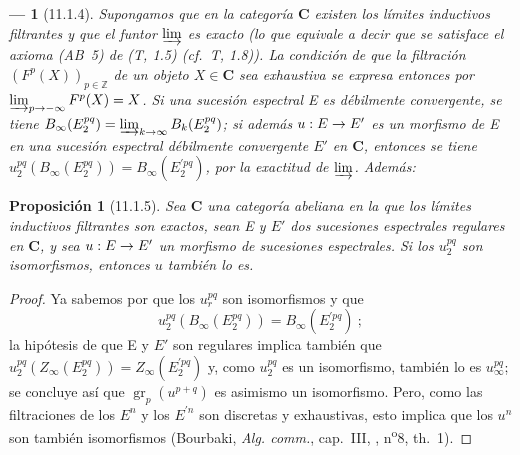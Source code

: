 \documentclass[10pt,oneside,openany]{book}
\theoremstyle{egaenv}\newtheorem*{env}{---}
\theoremstyle{egastatement}
\newtheorem*{proposition}{Proposición}
\theoremstyle{egadescription}
\newcommand{\oldpage}[2][]{\marginnote{\normalfont\scriptsize\textbf{#1}\,|\,#2}\ignorespaces}
\renewcommand{\to}{\mathchoice{\longrightarrow}{\rightarrow}{\rightarrow}{\rightarrow}}
\begin{document}
\begin{env}[11.1.4]
\label{0.11.1.4}
\label{0.11.1.4-fr}
Supongamos que en la categoría $\boldsymbol{C}$ existen los límites inductivos filtrantes y que el funtor $\varinjlim$ es \emph{exacto} (lo que equivale a decir que se satisface el axioma (AB~5) de (T, 1.5) (cf.~T, 1.8)).
La condición de que la filtración $(F^p(X))_{p\in\mathbb Z}$ de un objeto $X\in\boldsymbol{C}$ sea exhaustiva se expresa entonces por $\varinjlim_{p\to-\infty}F^p(X)=X$. Si una sucesión espectral E es débilmente convergente, se tiene
$B_\infty(E_2^{pq})=\varinjlim_{k\to\infty}B_k(E_2^{pq})$; si además $u:E\to E'$ es un morfismo de E en una sucesión espectral débilmente convergente $E'$ en $\boldsymbol{C}$, entonces se tiene $u_2^{pq}(B_\infty(E_2^{pq}))=B_\infty(E_2^{\prime pq})$, por la exactitud de $\varinjlim$.
Además:
\end{env}

\begin{proposition}[11.1.5]
\label{0.11.1.5}
\label{0.11.1.5-fr}
Sea $\mathbf{C}$ una categoría abeliana en la que los límites inductivos filtrantes son exactos, sean \textup{E} y $E'$ dos sucesiones espectrales regulares en $\mathbf{C}$, y sea $u:E\to E'$ un morfismo de sucesiones espectrales.
Si los $u_2^{pq}$ son isomorfismos, entonces $u$ también lo es.
\end{proposition}

\begin{proof}
Ya sabemos por  que los $u_r^{pq}$ son isomorfismos y que
\[
  u_2^{pq}(B_\infty(E_2^{pq}))=B_\infty(E_2^{\prime pq})~;
\]
\oldpage[0\textsubscript{III}]{26}
la hipótesis de que E y $E'$ son regulares implica también que $u_2^{pq}(Z_\infty(E_2^{pq}))=Z_\infty(E_2^{\prime pq})$ y, como $u_2^{pq}$ es un isomorfismo, también lo es $u_\infty^{pq}$; se concluye así que $\operatorname{gr}_p(u^{p+q})$ es asimismo un isomorfismo.
Pero, como las filtraciones de los $E^n$ y los $E^{\prime n}$ son discretas y exhaustivas, esto implica que los $u^n$ son también isomorfismos (Bourbaki, \emph{Alg. comm.}, cap.~III, , n\textsuperscript{o}8, th.~1).
\end{proof}
\end{document}
